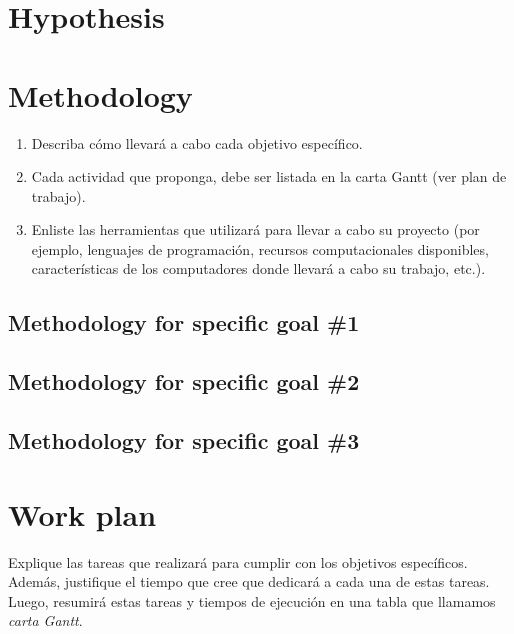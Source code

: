 \documentclass[MAIN.tex]{subfiles}
\begin{document}
\section{Hypothesis}


\section{Methodology}

\begin{enumerate}
\item Describa cómo llevará a cabo cada objetivo específico. 
\item Cada actividad que proponga, debe ser listada en la carta Gantt (ver plan de trabajo).
\item Enliste las herramientas que utilizará para llevar a cabo su proyecto (por ejemplo, lenguajes de programación, recursos computacionales disponibles, características de los computadores donde llevará a cabo su trabajo, etc.).  
\end{enumerate}

\subsection{Methodology for specific goal \#1} 

\subsection{Methodology for specific goal \#2}

\subsection{Methodology for specific goal \#3}


\section{Work plan}

Explique las tareas que realizará para cumplir con los objetivos
específicos. Además, justifique el tiempo que cree que dedicará a cada
una de estas tareas. Luego, resumirá estas tareas y tiempos de
ejecución en una tabla que llamamos \textit{carta Gantt}.
\end{document}
